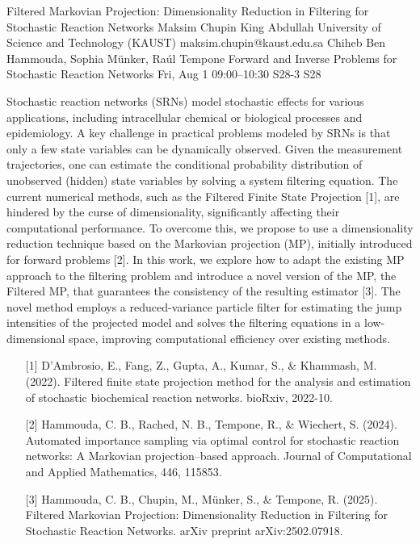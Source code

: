 \begin{talk}
  {Filtered Markovian Projection: Dimensionality Reduction in Filtering for Stochastic Reaction Networks}%
  {Maksim Chupin}%
  {King Abdullah University of Science and Technology (KAUST)}%
  {maksim.chupin@kaust.edu.sa}%
  {Chiheb Ben Hammouda, Sophia M\"{u}nker, Ra\'{u}l Tempone}%
  {Forward and Inverse Problems for Stochastic Reaction Networks}%
  {Fri, Aug 1 09:00–10:30}%
  {S28-3}%
  {S28}%
				
			
Stochastic reaction networks (SRNs) model stochastic effects for various applications, including intracellular chemical or biological processes and epidemiology. A key challenge in practical problems modeled by SRNs is that only a few state variables can be dynamically observed. Given the measurement trajectories, one can estimate the conditional probability distribution of unobserved (hidden) state variables by solving a system filtering equation. The current numerical methods, such as the Filtered Finite State Projection [1], are hindered by the curse of dimensionality, significantly affecting their computational performance. To overcome this, we propose to use a dimensionality reduction technique based on the Markovian projection (MP), initially introduced for forward problems [2]. In this work, we explore how to adapt the existing MP approach to the filtering problem and introduce a novel version of the MP, the Filtered MP, that guarantees the consistency of the resulting estimator [3]. The novel method employs a reduced-variance particle filter for estimating the jump intensities of the projected model and solves the filtering equations in a low-dimensional space, improving computational efficiency over existing methods.





\medskip

\begin{enumerate}
	\item[{[1]}] D’Ambrosio, E., Fang, Z., Gupta, A., Kumar, S., \& Khammash, M. (2022). Filtered finite state projection method for the analysis and estimation of stochastic biochemical reaction networks. bioRxiv, 2022-10.
	\item[{[2]}] Hammouda, C. B., Rached, N. B., Tempone, R., \& Wiechert, S. (2024). Automated importance sampling via optimal control for stochastic reaction networks: A Markovian projection–based approach. Journal of Computational and Applied Mathematics, 446, 115853.
    \item [{[3]}] Hammouda, C. B., Chupin, M., Münker, S., \& Tempone, R. (2025). Filtered Markovian Projection: Dimensionality Reduction in Filtering for Stochastic Reaction Networks. arXiv preprint arXiv:2502.07918.
\end{enumerate}


\end{talk}

